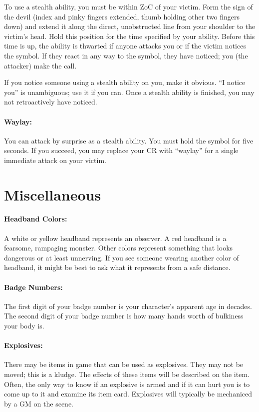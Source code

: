 \documentclass[sheet]{airship}
\begin{document}
To use a stealth ability, you must be within ZoC of your victim.  Form
the sign of the devil (index and pinky fingers extended, thumb holding
other two fingers down) and extend it along the direct, unobstructed
line from your shoulder to the victim's head.  Hold this position for
the time specified by your ability.  Before this time is up, the
ability is thwarted if anyone attacks you or if the victim notices the
symbol.  If they react in any way to the symbol, they have noticed;
you (the attacker) make the call.

If you notice someone using a stealth ability on you, make it obvious.
``I notice you'' is unambiguous; use it if you can.  Once a stealth
ability is finished, you may not retroactively have noticed.

\paragraph{Waylay:} You can attack by surprise as a stealth ability.
You must hold the symbol for five seconds.  If you succeed, you may
replace your CR with ``waylay'' for a single immediate attack on your
victim.

\section{Miscellaneous}

\paragraph{Headband Colors:} A white or yellow headband represents an
observer.  A red headband is a fearsome, rampaging monster. Other colors represent something that looks dangerous or at
least unnerving.  If you see someone wearing another color of
headband, it might be best to ask what it represents from a safe
distance.

\paragraph{Badge Numbers:} The first digit of your badge number is
your character's apparent age in decades. The second digit of your badge number is how many hands worth of bulkiness your body is.

\paragraph{Explosives:} There may be items in game that can be used as explosives. They may not be moved; this is a kludge. The effects of these items will be described on the item.  Often, the only way to know if an explosive is armed and if it can hurt you is to come up to it and examine its item card. Explosives will typically be mechaniced by a GM on the scene.
\end{document}

